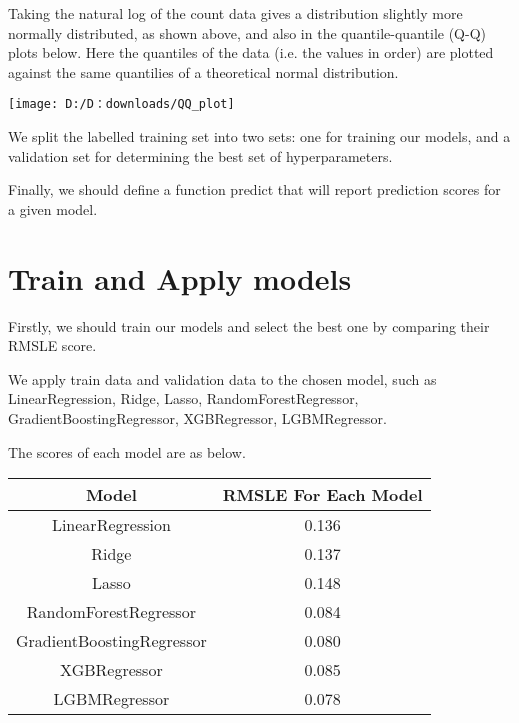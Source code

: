 Taking the natural log of the count data gives a distribution slightly more normally distributed, as shown above, and also in the quantile-quantile (Q-Q) plots below. Here the quantiles of the data (i.e. the values in order) are plotted against the same quantilies of a theoretical normal distribution.

\begin{center}
	\centering
\texttt{[image: D:/D：downloads/QQ\_plot]}
\centering
\end{center}

We split the labelled training set into two sets: one for training our models, and a validation set for determining the best set of hyperparameters.

Finally, we should define a function predict that will report prediction scores for a given model.



\section{Train and Apply models} \label{sec-experiment}

Firstly, we should train our models and select the best one by comparing their RMSLE score.

We apply train data and validation data to the chosen model, such as LinearRegression, Ridge, Lasso, RandomForestRegressor,
GradientBoostingRegressor, XGBRegressor, LGBMRegressor.

The scores of each model are as below.

\vspace{.5cm}

\begin{tabular}{ c | c  }
	\toprule
	Model     &  RMSLE For Each Model         \\
	\midrule
	LinearRegression       & 0.136  \\
	
	Ridge       & 0.137  \\
	
	Lasso       & 0.148  \\
	
	RandomForestRegressor       & 0.084  \\
	
	GradientBoostingRegressor       & 0.080  \\
	
	XGBRegressor      & 0.085  \\
	
	LGBMRegressor      & 0.078  \\
	
	\bottomrule
\end{tabular}

